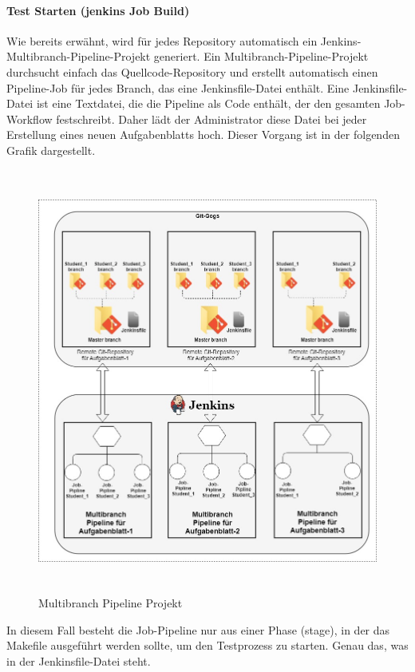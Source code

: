 \documentclass[apaper4,12p]{scrartcl}
\begin{document}
\paragraph{Test Starten (jenkins Job Build)}
Wie bereits erwähnt, wird für jedes Repository automatisch ein Jenkins-Multibranch-Pipeline-Projekt generiert. Ein Multibranch-Pipeline-Projekt durchsucht einfach das Quellcode-Repository und erstellt automatisch einen Pipeline-Job für jedes Branch, das eine Jenkinsfile-Datei enthält. 
\newline
Eine Jenkinsfile-Datei ist eine Textdatei, die die Pipeline als Code enthält, der den gesamten Job-Workflow festschreibt. Daher lädt der Administrator diese Datei bei jeder Erstellung eines neuen Aufgabenblatts hoch. Dieser Vorgang ist in der folgenden Grafik dargestellt.
\begin{figure}[h!]
	\begin{center}
		\includegraphics[width=13cm, height=14cm]{GogsJenkins.jpg}
		\caption{Multibranch Pipeline Projekt} 
		\label{ Multibranch Pipeline Projek } 
	\end{center}
\end{figure}
\newline
In diesem Fall besteht die Job-Pipeline nur aus einer Phase (stage), in der das Makefile ausgeführt werden sollte, um den Testprozess zu starten. Genau das, was in der Jenkinsfile-Datei steht.
\end{document}
